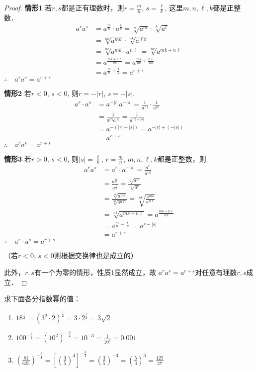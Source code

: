 \begin{proof}
\textbf{情形1 } 若$r,s$都是正有理数时，则$r=\frac{m}{n}$, $s=\frac{\ell}{k}$, 
这里$m,n,\ell,k$都是正整数．
\[\begin{split}
a^r a^s&= a^{\tfrac{m}{n}}\cdot a^{\tfrac{\ell}{k}} =\sqrt[n]{a^m}\cdot \sqrt[k]{a^{\ell}}\\
&=\sqrt[nk]{a^{mk}}\cdot \sqrt[nk]{a^{\ell n}}\\
&=\sqrt[nk]{a^{mk}\cdot a^{n\ell}}=\sqrt[nk]{a^{mk+n\ell}}\\
&=a^{\tfrac{mk+n\ell}{nk}}=a^{\tfrac{mk}{nk}+\tfrac{n\ell}{nk}}\\
&=a^{\tfrac{m}{n}+\tfrac{1}{k}}=a^{r+s}
\end{split}\]
$\therefore\quad a^r a^s=a^{r+s}$

\textbf{情形2 } 若$r<0$, $s<0$, 则$r=-|r|$, $s=-|s|$.
\[\begin{split}
a^r\cdot a^s &= a^{-|r|}a^{-|s|}=\frac{1}{a^{|r|}}\cdot \frac{1}{a^{|s|}}\\
&=\frac{1}{a^{|r|}a^{|s|}}=\frac{1}{a^{|r|+|s|}}\\
&=a^{-(|r|+|s|)}=a^{-|r|+(-|s|)}\\
&=a^{r+s}
\end{split}\]
$\therefore\quad a^r a^s=a^{r+s}$


\textbf{情形3 } 若$r>0$, $s<0$, 则$|s|=\frac{\ell}{k}$, $r=\frac{m}{n}$, 
$m,n,\ell,k$都是正整数，则
\[\begin{split}
a^r a^s&=a^r\cdot  a^{-|s|}=\frac{a^r}{a^{|s|}}\\
&=\frac{a^{\tfrac{m}{n}}}{a^{\tfrac{\ell}{k}}}=\frac{\sqrt[n]{a^m}}{\sqrt[k]{a^{\ell}}}\\
&=\frac{\sqrt[nk]{a^{mk}}}{\sqrt[nk]{a^{n\ell}}}=\sqrt[nk]{\frac{a^{mk}}{a^{n\ell}}}\\
&=\sqrt[nk]{a^{mk-n\ell}}=a^{\tfrac{mk-n\ell}{nk}}\\
&=a^{\tfrac{m}{n}-\tfrac{\ell}{k}}=a^{r-|s|}\\
&=a^{r+s}
\end{split}\]
$\therefore\quad a^r\cdot  a^s=a^{r+s}$

（若$r<0$, $s<0$则根据交换律也是成立的）

此外，$r,s$有一个为零的情形，性质1显然成立，故
$a^ra^s=a^{r+s}$对任意有理数$r,s$成立．
\end{proof}

\begin{example}
求下面各分指数幂的值：
\begin{enumerate}
\item $18^{\tfrac{1}{2}}=\left(3^2\cdot 2\right)^{\tfrac{1}{2}}=3\cdot 2^{\tfrac{1}{2}}=3\sqrt{2}$
\item $100^{-\tfrac{3}{2}}=(10^2)^{-\tfrac{3}{2}}=10^{-3}=\frac{1}{10^3}=0.001$
\item $\left(\frac{81}{625}\right)^{-\tfrac{3}{4}}=\left[\left(\frac{3}{5}\right)^4\right]^{-\tfrac{3}{4}}=\left(\frac{3}{5}\right)^{-3}=\left(\frac{5}{3}\right)^3=\frac{125}{27}$
\end{enumerate}
\end{example}
    
